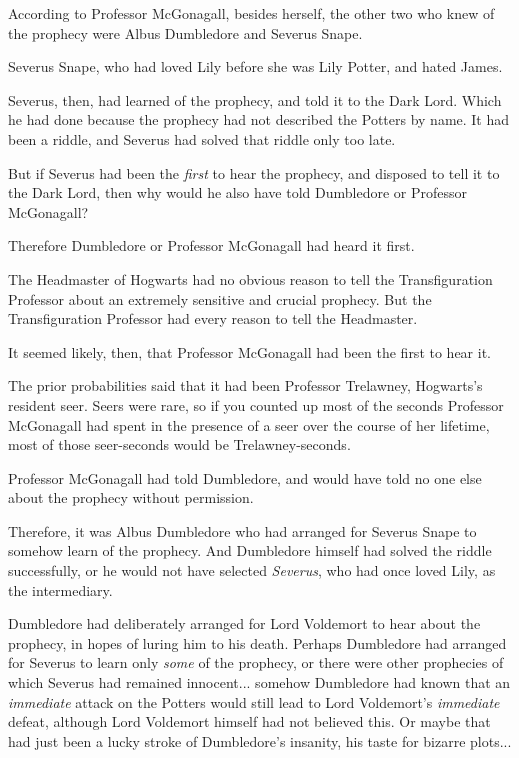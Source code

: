 According to Professor McGonagall, besides herself, the other two who knew of the prophecy were Albus Dumbledore and Severus Snape.

Severus Snape, who had loved Lily before she was Lily Potter, and hated James.

Severus, then, had learned of the prophecy, and told it to the Dark Lord. Which he had done because the prophecy had not described the Potters by name. It had been a riddle, and Severus had solved that riddle only too late.

But if Severus had been the \emph{first} to hear the prophecy, and disposed to tell it to the Dark Lord, then why would he also have told Dumbledore or Professor McGonagall?

Therefore Dumbledore or Professor McGonagall had heard it first.

The Headmaster of Hogwarts had no obvious reason to tell the Transfiguration Professor about an extremely sensitive and crucial prophecy. But the Transfiguration Professor had every reason to tell the Headmaster.

It seemed likely, then, that Professor McGonagall had been the first to hear it.

The prior probabilities said that it had been Professor Trelawney, Hogwarts's resident seer. Seers were rare, so if you counted up most of the seconds Professor McGonagall had spent in the presence of a seer over the course of her lifetime, most of those seer-seconds would be Trelawney-seconds.

Professor McGonagall had told Dumbledore, and would have told no one else about the prophecy without permission.

Therefore, it was Albus Dumbledore who had arranged for Severus Snape to somehow learn of the prophecy. And Dumbledore himself had solved the riddle successfully, or he would not have selected \emph{Severus}, who had once loved Lily, as the intermediary.

Dumbledore had deliberately arranged for Lord Voldemort to hear about the prophecy, in hopes of luring him to his death. Perhaps Dumbledore had arranged for Severus to learn only \emph{some} of the prophecy, or there were other prophecies of which Severus had remained innocent... somehow Dumbledore had known that an \emph{immediate} attack on the Potters would still lead to Lord Voldemort's \emph{immediate} defeat, although Lord Voldemort himself had not believed this. Or maybe that had just been a lucky stroke of Dumbledore's insanity, his taste for bizarre plots...

